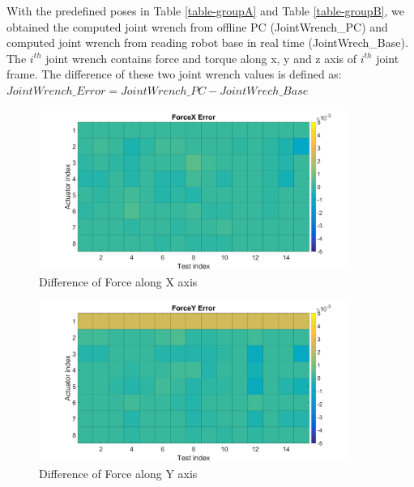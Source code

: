
With the predefined poses in Table \ref{table-groupA} and Table \ref{table-groupB}, we obtained the computed joint wrench from offline PC (JointWrench\_PC) and computed joint wrench from reading robot base in real time (JointWrech\_Base). The $i^{th}$ joint wrench contains force and torque along x, y and z axis of $i^{th}$ joint frame. The difference of these two joint wrench values is defined as: $JointWrench\_Error = JointWrench\_PC - JointWrech\_Base$

\begin{figure}
	\begin{center}
		\includegraphics[width=0.9\textwidth]{./images/Result1.png}%
		\caption{Difference of Force along X axis}
		\label{fig:forcex}%
	\end{center}
\end{figure}

\begin{figure}
	\begin{center}
		\includegraphics[width=0.9\textwidth]{./images/Result2.png}%
		\caption{Difference of Force along Y axis}
		\label{fig:forcey}%
	\end{center}
\end{figure}

